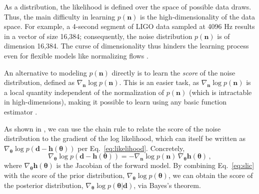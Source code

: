 \documentclass[twocolumn]{aastex631}
\begin{document}
As a distribution, the likelihood is defined over the space of possible data draws. Thus, the main difficulty in learning $p(\boldsymbol{n})$ is the high-dimensionality of the data space. For example, a 4-second segment of LIGO data sampled at 4096 Hz results in a vector of size 16,384; consequently, the noise distribution $p(\boldsymbol{n})$ is of dimension 16,384. The curse of dimensionality thus hinders the learning process even for flexible models like normalizing flows \citep{2019NFreview, 2019arXiv191202762P}.


An alternative to modeling $p(\boldsymbol{n})$ directly is to learn the \emph{score} of the noise distribution, defined as $\nabla_{\boldsymbol{n}} \log p(\boldsymbol{n})$. This is an easier task, as $\nabla_{\boldsymbol{n}} \log p(\boldsymbol{n})$ is a local quantity independent of the normalization of $p(\boldsymbol{n})$ (which is intractable in high-dimensions), making it possible to learn using any basic function estimator \citep[e.g., simple feedforward neural networks,][]{2019arXiv190705600S}.


As shown in \cite{legin}, we can use the chain rule to relate the score of the noise distribution to the gradient of the log likelihood, which can itself be written as $\nabla_{\boldsymbol{\theta}} \log p(\boldsymbol{d} -\boldsymbol{h}(\boldsymbol{\theta}))$ per Eq.~\eqref{eq:likelihood}. Concretely,
\begin{equation}
  \label{eq:slic}
  \nabla_{\boldsymbol{\theta}} \log p(\boldsymbol{d} - \boldsymbol{h}(\boldsymbol{\theta})) = -\nabla_{\boldsymbol{n}} \log p(\boldsymbol{n})\, \nabla_{\boldsymbol{\theta}} \boldsymbol{h}(\boldsymbol{\theta})\, , 
\end{equation}
where $\nabla_{\boldsymbol{\theta}} \boldsymbol{h}(\boldsymbol{\theta})$ is the Jacobian of the forward model. By combining Eq.~\eqref{eq:slic} with the score of the prior distribution, $\nabla_{\boldsymbol{\theta}} \log p(\boldsymbol{\theta})$, we can obtain the score of the posterior distribution, $\nabla_{\boldsymbol{\theta}} \log p(\boldsymbol{\theta}|\boldsymbol{d})$, via Bayes's theorem.
\end{document}
